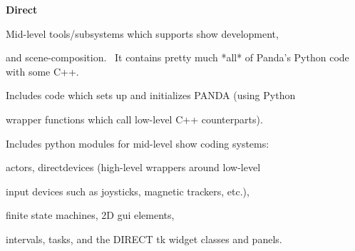 \documentclass[a4paper]{article}
\begin{document}
{\centering\sffamily\bfseries
\hypertarget{RefHeading17511167907073}{}Direct
\par}

Mid-level tools/subsystems which supports show development,

and scene-composition. \ It contains pretty much *all* of Panda's Python code with some C++. \ 

Includes code which sets up and initializes PANDA (using Python

wrapper functions which call low-level C++ counterparts). \ 

Includes python modules for mid-level show coding systems: 

actors, directdevices (high-level wrappers around low-level 

input devices such as joysticks, magnetic trackers, etc.), 

finite state machines, 2D gui elements,

intervals, tasks, and the DIRECT tk widget classes and panels.
\end{document}
